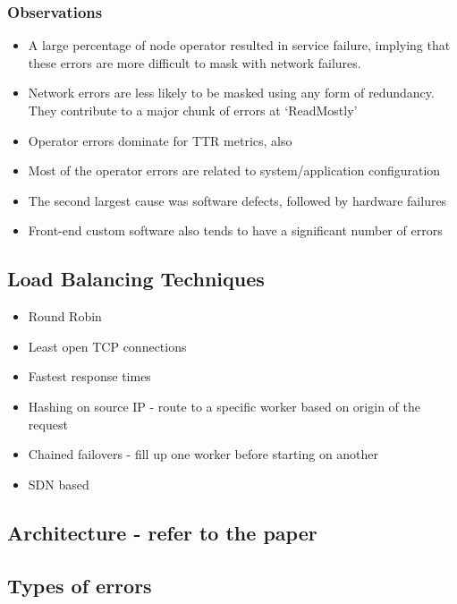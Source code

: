 \documentclass[a4paper]{article}
\begin{document}
\subsubsection{Observations}

\begin{itemize}
\item
    A large percentage of node operator resulted in service failure,
    implying that these errors are more difficult to mask with network
    failures.
\item
    Network errors are less likely to be masked using any form of
    redundancy. They contribute to a major chunk of errors at `ReadMostly'
\item
    Operator errors dominate for TTR metrics, also
\item
    Most of the operator errors are related to system/application
    configuration
\item
    The second largest cause was software defects, followed by hardware
    failures
\item
    Front-end custom software also tends to have a significant number of
    errors
\end{itemize}

\subsection{Load Balancing Techniques}

\begin{itemize}
\item
    Round Robin
\item
    Least open TCP connections
\item
    Fastest response times
\item
    Hashing on source IP - route to a specific worker based on origin of
    the request
\item
    Chained failovers - fill up one worker before starting on another
\item
    SDN based
\end{itemize}

\subsection{Architecture - refer to the paper}

\subsection{Types of errors}
\end{document}
